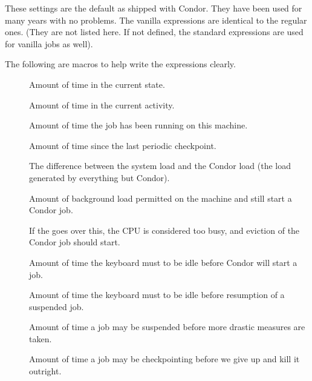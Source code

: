 These settings are the default as shipped with Condor.  They have been
used for many years with no problems.  The vanilla expressions are
identical to the regular ones. (They are not listed here.  If
not defined, the standard expressions are used for vanilla jobs
as well).

The following are macros to help write the expressions
clearly.

\begin{description}
  
\item[] Amount of time in the current state.

\item[] Amount of time in the current activity. 

\item[] Amount of time the job has been running on
  this machine.

\item[] Amount of time since the last periodic checkpoint.

\item[] The difference between the system load and
  the Condor load (the load generated by everything but Condor).

\item[] Amount of background load permitted
  on the machine and still start a Condor job.

\item[] If the  goes over
  this, the CPU is considered too busy, and eviction of the Condor
  job should start. 

\item[] Amount of time the keyboard must to be idle
  before Condor will start a job.

\item[] Amount of time the keyboard must to be idle
  before resumption of a suspended job.

\item[] Amount of time a job may be
  suspended before more drastic measures are taken.

\item[] Amount of time a job may be
  checkpointing before we give up and kill it outright.


\end{description}
